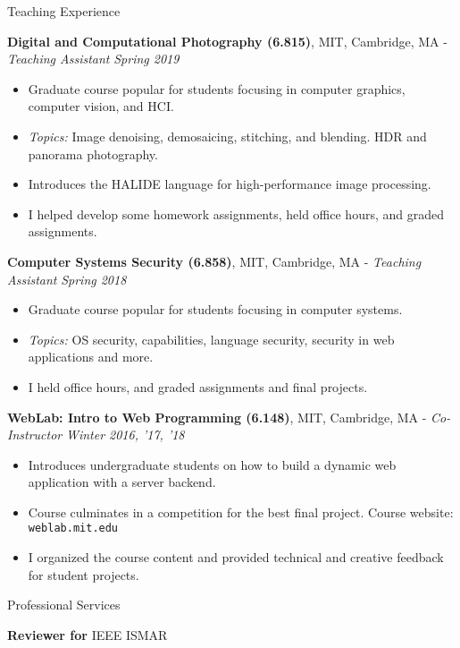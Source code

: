 \documentclass{resume}
\begin{document}
\begin{area}{Teaching Experience}
    \item
        \textbf{Digital and Computational Photography (6.815)}, MIT, Cambridge, MA - \emph{Teaching Assistant} \hfill \emph{Spring 2019}
        \begin{itemize}
            \item Graduate course popular for students focusing in computer graphics, computer vision, and HCI.
            \item \emph{Topics:} Image denoising, demosaicing, stitching, and blending. HDR and panorama photography.
            \item Introduces the HALIDE language for high-performance image processing.
            \item I helped develop some homework assignments, held office hours, and graded assignments.
        \end{itemize}
    \item
        \textbf{Computer Systems Security (6.858)}, MIT, Cambridge, MA - \emph{Teaching Assistant} \hfill \emph{Spring 2018}
        \begin{itemize}
            \item Graduate course popular for students focusing in computer systems.
            \item \emph{Topics:} OS security, capabilities, language security, security in web applications and more.
            \item I held office hours, and graded assignments and final projects.
        \end{itemize}
    \item
        \textbf{WebLab: Intro to Web Programming (6.148)}, MIT, Cambridge, MA - \emph{Co-Instructor} \hfill \emph{Winter 2016, '17, '18}
        \begin{itemize}
            \item Introduces undergraduate students on how to build a dynamic web application with a server backend.
            \item Course culminates in a competition for the best final project. Course website: \texttt{weblab.mit.edu}
            \item I organized the course content and provided technical and creative feedback for student projects.
        \end{itemize}
\end{area}

\begin{area}{Professional Services}
    \item \textbf{Reviewer for} IEEE ISMAR
\end{area}
\end{document}
